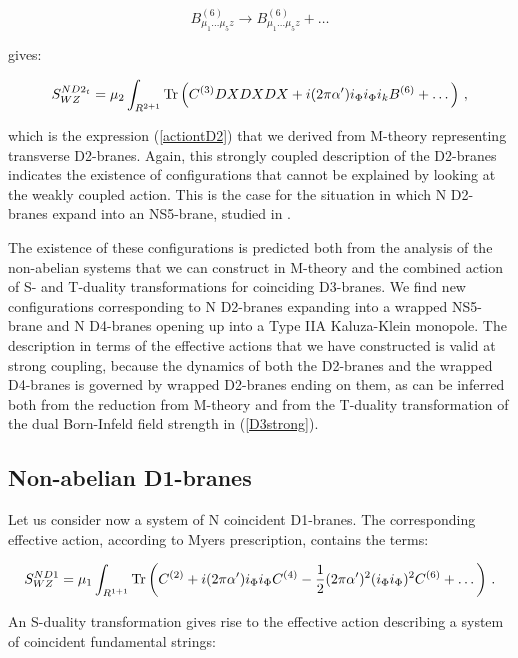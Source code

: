\documentclass[12pt,a4paper]{article}
\begin{document}
\begin{equation}
B^{(6)}_{\mu_1\dots\mu_5 z}\rightarrow B^{(6)}_{\mu_1\dots\mu_5 z}+
\dots
\end{equation}

\noindent gives:

\begin{equation}
S^{ND2_t}_{WZ}=\mu_2\int_{R^{2+1}}{\rm Tr}\left(C^{(3)}DXDXDX+
i(2\pi\alpha^\prime)i_\Phi i_\Phi i_k B^{(6)}+\dots\right)\, ,
\end{equation}

\noindent which is the expression (\ref{actiontD2}) that we
derived from M-theory representing transverse D2-branes.
Again, this strongly coupled description of the D2-branes indicates
the existence of configurations that cannot be explained
by looking at the weakly coupled action. 
This is the case for the situation in which N D2-branes
expand into an NS5-brane, studied in \cite{Bena}.

The existence of these configurations is
predicted both from the analysis of the non-abelian systems
that we can construct in M-theory and the combined action of
S- and T-duality transformations for coinciding D3-branes.
We find new configurations corresponding to N D2-branes expanding 
into a wrapped NS5-brane \cite{Bena} and N D4-branes opening 
up into a Type IIA Kaluza-Klein monopole. 
The description in terms of the effective actions
that we have constructed is
valid at strong coupling, because the dynamics of both the
D2-branes and the wrapped D4-branes is governed by wrapped D2-branes
ending on them, as can be inferred both from the reduction from
M-theory and from the T-duality transformation
of the dual Born-Infeld field strength in (\ref{D3strong}).
 

\subsection{Non-abelian D1-branes}

Let us consider now a system of N coincident D1-branes. The 
corresponding effective action, according to Myers prescription,
contains the terms:

\begin{equation}
S^{N D1}_{WZ}=\mu_1\int_{R^{1+1}}{\rm Tr}
\left(C^{(2)}+i(2\pi\alpha^\prime)i_\Phi i_\Phi C^{(4)}
-\frac12 (2\pi\alpha^\prime)^2 (i_\Phi i_\Phi)^2 C^{(6)}
+\dots\right)\, .
\end{equation}

\noindent An S-duality transformation gives rise to the effective
action describing a system of coincident fundamental strings:
\end{document}
